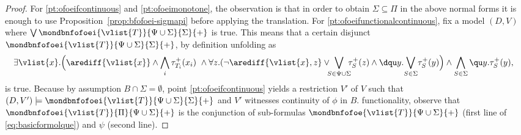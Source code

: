 \begin{proof}
	For \ref{pt:ofoeifcontinuous} and \ref{pt:ofoeimonotone}, the
observation is that in order to obtain $\Sigma\subseteq\Pi$ in the
above normal forms it is enough to use
Proposition~\ref{prop:bfofoei-sigmapi} before applying the
translation. For \ref{pt:ofoeifunctionalcontinuous}, fix a model
$(D,V)$ where $\bigvee \mondbnfofoei{\vlist{T}}{\Psi \cup
\Sigma}{\Sigma}{+}$ is true. This means that a certain disjunct
$\mondbnfofoei{\vlist{T}}{\Psi \cup \Sigma}{ \Sigma}{+}$, by
definition unfolding as
	\begin{equation*}%
	\begin{aligned}
&\exists \vlist{x}.\Big( \arediff{\vlist{x}} \land \bigwedge_i
\tau^+_{T_i}(x_i)\ \land 
 \forall z.(\lnot\arediff{\vlist{x},z} \lor \!\!\!\bigvee_{S\in \Psi
\cup \Sigma}\!\!\! \tau^+_S(z) 
 \land \dqu y. \!\bigvee_{S\in\Sigma}\! \tau^+_S(y) \Big) \land
\bigwedge_{S\in\Sigma} \qu y.\tau^+_S(y),
\end{aligned}
\end{equation*}
is true. Because by assumption $B \cap \Sigma = \emptyset$, point
\ref{pt:ofoeifcontinuous} yields a restriction $V'$ of $V$ such that
$(D,V') \models \mondbnfofoei{\vlist{T}}{\Psi \cup \Sigma}{
\Sigma}{+}$ and $V'$ witnesses continuity of $\phi$ in $B$. %
functionality, observe that $\mondbnfofoei{\vlist{T}}{\Pi}{\Psi \cup
\Sigma}{+}$ is the conjunction of sub-formulas
$\mondbnfofoe{\vlist{T}}{\Psi \cup \Sigma}{+}$ (first line of
\eqref{eq:basicformolque}) and $\psi$ (second line). 


\end{proof}
